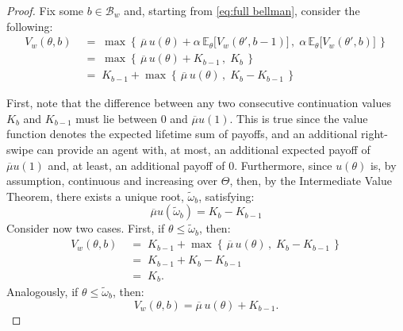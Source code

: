 \begin{proof}
    Fix some $b\in\mathcal{B}_w$ and, starting from \autoref{eq:full bellman}, consider the following:
    \begin{equation*}
        \begin{aligned} 
            V_w(\theta,b) \;&=\;\max\left\{\,\overline{\mu} \, u(\theta) +\alpha \,\mathbb{E}_\theta \Big[V_w(\theta', b-1)\Big]\,,\; \alpha\,\mathbb{E}_\theta \Big[ V_w(\theta', b)\Big]\,\right\}\\
            &=\; \max\left\{\,\overline{\mu} \, u(\theta) + K_{b-1} \,,\; K_b \,\right\}\\
            &=\; K_{b-1} + \max\left\{\,\overline{\mu} \, u(\theta) \,,\; K_b - K_{b-1}\,\right\}
        \end{aligned}
    \end{equation*}
    
    First, note that the difference between any two consecutive continuation values $K_b$ and $K_{b-1}$ must lie between 0 and $\overline{\mu}u(1)$. 
    This is true since the value function denotes the expected lifetime sum of payoffs, and an additional right-swipe can provide an agent with, at most, an additional expected payoff of $\overline{\mu}u(1)$ and, at least, an additional payoff of $0$.
    Furthermore, since $u(\theta)$ is, by assumption, continuous and increasing over $\Theta$, then, by the Intermediate Value Theorem, there exists a unique root, $\widetilde\omega_b$, satisfying:
    \begin{equation*} 
            \overline\mu u(\widetilde\omega_b) = K_b-K_{b-1}   
    \end{equation*}
    Consider now two cases. First, if $\theta\leq\widetilde\omega_b$, then:
    \begin{equation*}
        \begin{aligned} 
            V_w(\theta,b) \;&=\; K_{b-1} + \max\left\{\,\overline{\mu} \, u(\theta) \,,\; K_b - K_{b-1}\,\right\}\\
            &=\; K_{b-1} + K_b - K_{b-1}\\
            &=\; K_b.
        \end{aligned}
    \end{equation*}
    Analogously, if $\theta\leq\widetilde\omega_b$, then:
    \begin{equation*}
        V_w(\theta,b) = \overline{\mu} \, u(\theta) + K_{b-1}. 
    \end{equation*} 


\end{proof}
